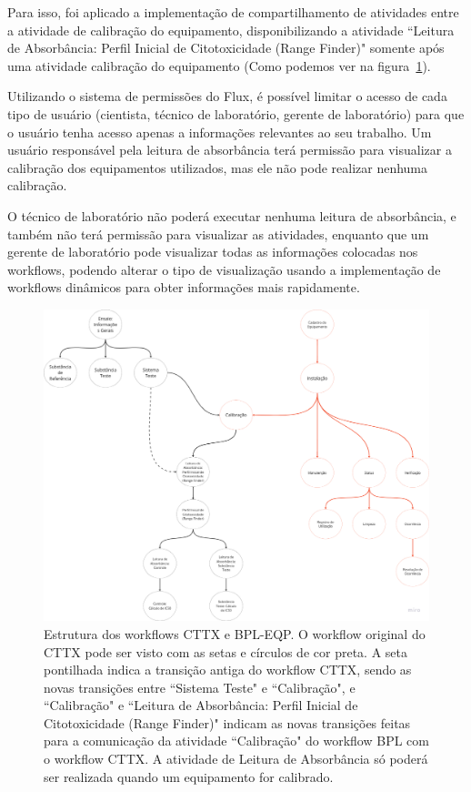 Para isso, foi aplicado a implementação de compartilhamento de atividades entre a atividade de calibração do equipamento, disponibilizando a atividade ``Leitura de Absorbância: Perfil Inicial de Citotoxicidade (Range Finder)" somente após uma atividade calibração do equipamento (Como podemos ver na figura~\ref{fig:cttx_eqp_structure}).

Utilizando o sistema de permissões do Flux, é possível limitar o acesso de cada tipo de usuário (cientista, técnico de laboratório, gerente de laboratório) para que o usuário tenha acesso apenas a informações relevantes ao seu trabalho. Um usuário responsável pela leitura de absorbância terá permissão para visualizar a calibração dos equipamentos utilizados, mas ele não pode realizar nenhuma calibração.

O técnico de laboratório não poderá executar nenhuma leitura de absorbância, e também não terá permissão para visualizar as atividades, enquanto que um gerente de laboratório pode visualizar todas as informações colocadas nos workflows, podendo alterar o tipo de visualização usando a implementação de workflows dinâmicos para obter informações mais rapidamente.

\begin{figure}
    \centering
    \includegraphics[width=1\textwidth]{imgs/CTTX-EQP/estrutura_cttx_eqp.png}
    \caption{Estrutura dos workflows CTTX e BPL-EQP. O workflow original do CTTX pode ser visto com as setas e círculos de cor preta. A seta pontilhada indica a transição antiga do workflow CTTX, sendo as novas transições entre ``Sistema Teste" e ``Calibração", e ``Calibração" e ``Leitura de Absorbância: Perfil Inicial de Citotoxicidade (Range Finder)" indicam as novas transições feitas para a comunicação da atividade ``Calibração" do workflow BPL com o workflow CTTX. A atividade de Leitura de Absorbância só poderá ser realizada quando um equipamento for calibrado.}
    \label{fig:cttx_eqp_structure}
\end{figure}


